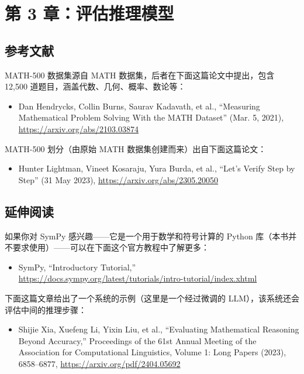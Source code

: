 \section{第 3 章：评估推理模型}

\subsection{参考文献}

MATH-500 数据集源自 MATH 数据集，后者在下面这篇论文中提出，包含 12,500 道题目，涵盖代数、几何、概率、数论等：

\begin{itemize}
\item Dan Hendrycks, Collin Burns, Saurav Kadavath, et al., “Measuring Mathematical Problem Solving With the MATH Dataset” (Mar. 5, 2021), \href{https://arxiv.org/abs/2103.03874}{https://arxiv.org/abs/2103.03874}
\end{itemize}

MATH-500 划分（由原始 MATH 数据集创建而来）出自下面这篇论文：

\begin{itemize}
\item Hunter Lightman, Vineet Kosaraju, Yura Burda, et al., “Let's Verify Step by Step” (31 May 2023), \href{https://arxiv.org/abs/2305.20050}{https://arxiv.org/abs/2305.20050}
\end{itemize}

\subsection{延伸阅读}

如果你对 SymPy 感兴趣——它是一个用于数学和符号计算的 Python 库（本书并不要求使用）——可以在下面这个官方教程中了解更多：

\begin{itemize}
\item SymPy, “Introductory Tutorial,” \href{https://docs.sympy.org/latest/tutorials/intro-tutorial/index.xhtml}{https://docs.sympy.org/latest/tutorials/intro-tutorial/index.xhtml}
\end{itemize}

下面这篇文章给出了一个系统的示例（这里是一个经过微调的 LLM），该系统还会评估中间的推理步骤：

\begin{itemize}
\item Shijie Xia, Xuefeng Li, Yixin Liu, et al., “Evaluating Mathematical Reasoning Beyond Accuracy,” Proceedings of the 61st Annual Meeting of the Association for Computational Linguistics, Volume 1: Long Papers (2023), 6858–6877, \href{https://arxiv.org/pdf/2404.05692}{https://arxiv.org/pdf/2404.05692}
\end{itemize}

